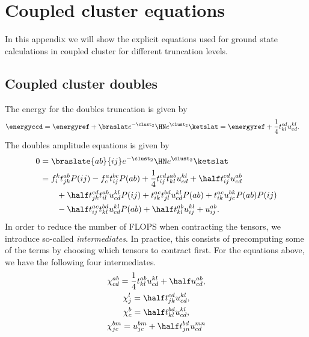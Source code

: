 \chapter{Coupled cluster equations}
    In this appendix we will show the explicit equations used for ground state
    calculations in coupled cluster for different truncation levels.

    \section{Coupled cluster doubles}
        The energy for the doubles truncation is given by
        \begin{align}
            \energyccd
            &= \energyref
            + \braslat e^{-\clust_2}\HN e^{\clust_2}\ketslat
            = \energyref
            + \frac{1}{4}t^{cd}_{kl} u^{kl}_{cd}.
        \end{align}
        The doubles amplitude equations is given by
        \begin{align}
            0 &= \braslate{ab}{ij}e^{-\clust_2}\HN e^{\clust_2}\ketslat
            \\
            &=
            f^{k}_{i} t^{ab}_{jk} P(ij)
            - f^{a}_{c} t^{bc}_{ij} P(ab)
            + \frac{1}{4} t^{cd}_{ij} t^{ab}_{kl} u^{kl}_{cd}
            + \half t^{cd}_{ij} u^{ab}_{cd}
            \nonumber \\
            &\qquad
            + \half t^{cd}_{jk} t^{ab}_{il} u^{kl}_{cd} P(ij)
            + t^{ac}_{ik} t^{bd}_{jl} u^{kl}_{cd} P(ab)
            + t^{ac}_{ik} u^{bk}_{jc} P(ab) P(ij)
            \nonumber \\
            &\qquad
            - \half t^{ac}_{ij} t^{bd}_{kl} u^{kl}_{cd} P(ab)
            + \half t^{ab}_{kl} u^{kl}_{ij}
            + u^{ab}_{ij}.
        \end{align}
        In order to reduce the number of FLOPS when contracting the tensors, we
        introduce so-called \emph{intermediates}. In practice, this consists of
        precomputing some of the terms by choosing which tensors to contract
        first. For the equations above, we have the following four
        intermediates.
        \begin{gather}
            \chi^{ab}_{cd} = \frac{1}{4}t^{ab}_{kl} u^{kl}_{cd}
            + \half u^{ab}_{cd},
            \\
            \chi^{l}_{j} = \half t^{cd}_{jk} u^{kl}_{cd},
            \\
            \chi^{b}_{c} = \half t^{bd}_{kl} u^{kl}_{cd},
            \\
            \chi^{bm}_{jc} = u^{bm}_{jc} + \half t^{bd}_{jn} u^{mn}_{cd}
        \end{gather}

